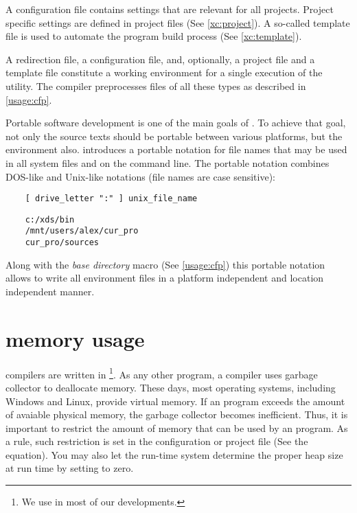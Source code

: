 A configuration file contains settings that are relevant for all
projects. Project specific settings are defined in project files (See
\ref{xc:project}). A so-called template file is used to automate
the program build process (See \ref{xc:template}).

A redirection file, a configuration file, and, optionally, a project file
and a template file constitute a working environment for a single
execution of the \xc{} utility. The compiler preprocesses files
of all these types as described in \ref{usage:cfp}.

Portable software development is one of the main goals of \XDS{}.
To achieve that goal, not only the source texts should be portable between
various platforms, but the environment also. \XDS{} introduces
a portable notation for file names
that may be used in all
system files and on the command line. The portable notation combines
DOS-like and Unix-like notations (file names are case sensitive):

\verb'    [ drive_letter ":" ] unix_file_name'

\Examples
\begin{verbatim}
    c:/xds/bin
    /mnt/users/alex/cur_pro
    cur_pro/sources
\end{verbatim}
Along with the {\em base directory} macro (See \ref{usage:cfp}) this portable
notation allows to write all environment files in a platform independent
and location independent manner.

\section{\XDS{} memory usage}
\label{config:memory}

\XDS{} compilers are written in \ot\footnote{We use
\XDS{} in most of our developments.}. As any other \ot{} program, a
compiler uses garbage collector to deallocate memory. These days,
most operating systems, including Windows and Linux,
provide virtual memory. If an \ot{} program exceeds the amount
of avaiable physical memory, the garbage collector becomes
inefficient. Thus, it is important to restrict the amount of memory
that can be used by an \ot{} program. As a rule, such restriction
is set in the configuration or project file (See the  equation).
You may also let the run-time system determine the proper heap size 
at run time by setting  to zero.

